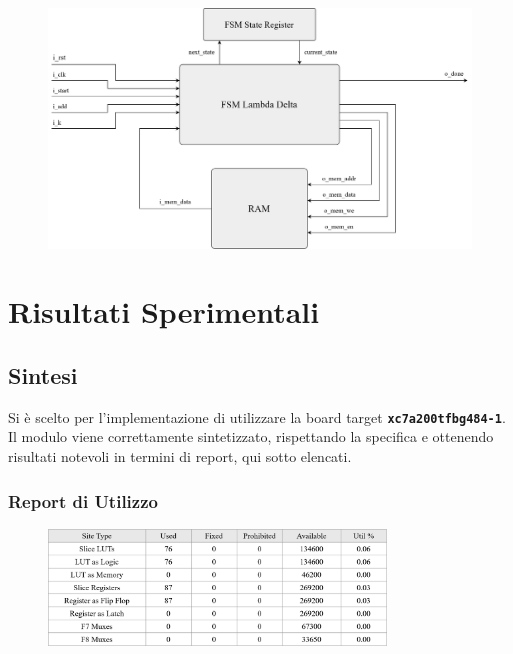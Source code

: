 \documentclass{article}
\begin{document}
\vspace{0.25cm}
\begin{figure}[h]
    \centering
    \includegraphics[width=1\textwidth]{images/architecture.png}
\end{figure}




\newpage
\section{Risultati Sperimentali}
\subsection{Sintesi}
Si è scelto per l'implementazione di utilizzare la board target \texttt{\textbf{xc7a200tfbg484-1}}. Il modulo viene correttamente sintetizzato, rispettando la specifica e ottenendo risultati notevoli in termini di report, qui sotto elencati.
\subsubsection{Report di Utilizzo}
\begin{figure}[h]
    \centering
    \includegraphics[width=0.8\textwidth]{images/synth_report.png}
\end{figure}
\end{document}
